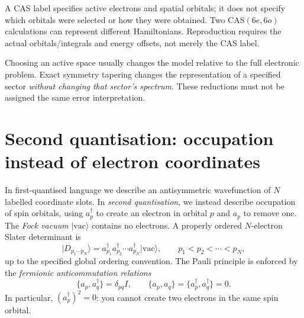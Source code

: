 \documentclass[11pt,a4paper,oneside]{report}
\newcommand{\ket}[1]{\lvert #1\rangle}
\begin{document}
A CAS label specifies active electrons and spatial orbitals; it does not specify which orbitals were selected or how they were obtained. Two CAS$(6e,6o)$ calculations can represent different Hamiltonians. Reproduction requires the actual orbitals/integrals and energy offsets, not merely the CAS label.

\begin{idea}
Choosing an active space usually changes the model relative to the full electronic problem. Exact symmetry tapering changes the representation of a specified sector \emph{without changing that sector's spectrum}. These reductions must not be assigned the same error interpretation.
\end{idea}


\section{Second quantisation: occupation instead of electron coordinates}
In first-quantised language we describe an antisymmetric wavefunction of $N$ labelled coordinate slots. In \emph{second quantisation}, we instead describe occupation of spin orbitals, using $a_p^\dagger$ to create an electron in orbital $p$ and $a_p$ to remove one. The \emph{Fock vacuum} $\ket{\mathrm{vac}}$ contains no electrons. A properly ordered $N$-electron Slater determinant is
\begin{equation}
\ket{D_{p_1\cdots p_N}}=a_{p_1}^\dagger a_{p_2}^\dagger\cdots a_{p_N}^\dagger\ket{\mathrm{vac}},
\qquad p_1<p_2<\cdots<p_N,
\end{equation}
up to the specified global ordering convention. The Pauli principle is enforced by the \emph{fermionic anticommutation relations}
\begin{equation}\label{eq:anticommutators}
\{a_p,a_q^\dagger\}=\delta_{pq}I,\qquad
\{a_p,a_q\}=\{a_p^\dagger,a_q^\dagger\}=0.
\end{equation}
In particular, $(a_p^\dagger)^2=0$: you cannot create two electrons in the same spin orbital.
\end{document}
